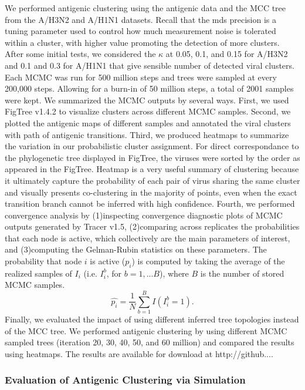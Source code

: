 \documentclass[11pt,oneside,letterpaper]{article}
\begin{document}
	
We performed antigenic clustering using the antigenic data and the MCC tree from the A/H3N2 and A/H1N1 datasets. 
Recall that the mds precision is a tuning parameter used to control how much measurement noise is tolerated within a cluster, with higher value promoting the detection of more clusters. 
After some initial tests, we considered the $\kappa$ at 0.05, 0.1, and 0.15 for A/H3N2 and 0.1 and 0.3 for A/H1N1 that give sensible number of detected viral clusters.  
Each MCMC was run for 500 million steps and trees were sampled at every 200,000 steps. 
Allowing for a burn-in of 50 million steps, a total of 2001 samples were kept.
We summarized the MCMC outputs by several ways. 
First, we used FigTree v1.4.2 to visualize clusters across different  MCMC samples. 
Second, we plotted the antigenic maps of different samples and annotated the viral clusters with path of antigenic transitions. 
Third, we produced heatmaps to summarize the variation in our probabilistic cluster assignment. 
For direct correspondance to the phylogenetic tree displayed in FigTree, the viruses were sorted by the order as appeared in the FigTree.
Heatmap is a very useful summary of clustering because it ultimately capture the probability of each pair of virus sharing the same cluster and visually presents co-clustering in the majority of points, even when the exact transition branch cannot be inferred with high confidence. %
Fourth, we performed convergence analysis by (1)inspecting convergence diagnostic plots of MCMC outputs generated by Tracer v1.5, (2)comparing across replicates the probabilities that each node is active, which collectively are the main parameters of interest, and (3)computing the Gelman-Rubin statistics on these parameters. 
The probability that node $i$ is active ($p_i$) is computed by taking the average of the realized samples of $I_i$ (i.e. $I_i^b$, for $b=1,...B$), where $B$ is the number of stored MCMC samples.
\begin{equation}
 \hat{p_i} = \frac{1}{N} \sum_{b=1}^{B} I(I_i^b  = 1).
\end{equation}
Finally, we evaluated the impact of using different inferred tree topologies instead of the MCC tree. 
We performed antigenic clustering by using different MCMC sampled trees (iteration 20, 30, 40, 50, and 60 million) and compared the results using heatmaps.
The results are available for download at http://github....


\subsubsection*{Evaluation of Antigenic Clustering via Simulation}
\end{document}
